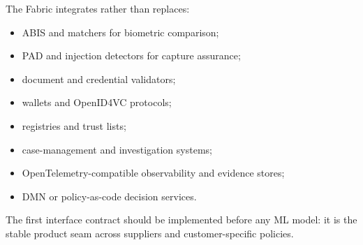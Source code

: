 The Fabric integrates rather than replaces:

\begin{itemize}
\item ABIS and matchers for biometric comparison;
\item PAD and injection detectors for capture assurance;
\item document and credential validators;
\item wallets and OpenID4VC protocols;
\item registries and trust lists;
\item case-management and investigation systems;
\item OpenTelemetry-compatible observability and evidence stores;
\item DMN or policy-as-code decision services.
\end{itemize}

The first interface contract should be implemented before any ML model: it is the stable product seam across suppliers and customer-specific policies.

